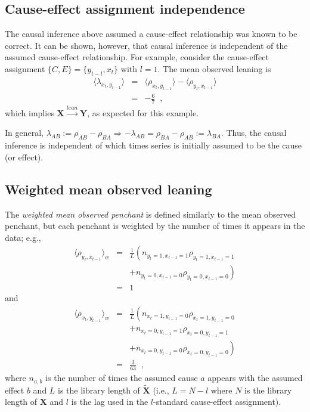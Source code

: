 \documentclass[twocolumn,aps,pre,groupedaddress]{revtex4-1}
\begin{document}
\subsection{Cause-effect assignment independence}
The causal inference above assumed a cause-effect relationship was known to be correct.  It can be shown, however, that causal inference is independent of the assumed cause-effect relationship.  For example, consider the cause-effect assignment $\{C,E\}=\{y_{t-l},x_t\}$ with $l=1$. The mean observed leaning is
\begin{eqnarray*}
\langle \lambda_{x_t,y_{t-1}} \rangle &=& \langle \rho_{x_t,y_{t-1}} \rangle - \langle \rho_{y_t,x_{t-1}} \rangle\\
&=& -\frac{6}{7}\;\;,
\end{eqnarray*}
which implies $\mathbf{X}\xrightarrow{lean}\mathbf{Y}$, as expected for this example.

In general, $\lambda_{AB} := \rho_{AB} - \rho_{BA}\Rightarrow -\lambda_{AB} = \rho_{BA} - \rho_{AB} := \lambda_{BA}$.  Thus, the causal inference is independent of which times series is initially assumed to be the cause (or effect).  

\subsection{Weighted mean observed leaning}
\label{sec:wmean}
The {\em weighted mean observed penchant} is defined similarly to the mean observed penchant, but each penchant is weighted by the number of times it appears in the data; e.g.,\
\begin{eqnarray*}
\langle \rho_{y_t,x_{t-1}} \rangle_w &=& \frac{1}{L}\left(n_{y_t=1,x_{t-1}=1}\rho_{y_t=1,x_{t-1}=1} \right.\\
& & \left.+ n_{y_t=0,x_{t-1}=0}\rho_{y_t=0,x_{t-1}=0}\right)\\
&=& 1
\end{eqnarray*}
and
\begin{eqnarray*}
\langle \rho_{x_t,y_{t-1}} \rangle_w &=& \frac{1}{L}\left(n_{x_t=1,y_{t-1}=0}\rho_{x_t=1,y_{t-1}=0} \right.\\
& & +n_{x_t=0,y_{t-1}=1}\rho_{x_t=0,y_{t-1}=1}\\
& & \left.+ n_{x_t=0,y_{t-1}=0}\rho_{x_t=0,y_{t-1}=0}\right)\\
&=& \frac{3}{63}\;\;,
\end{eqnarray*}
where $n_{a,b}$ is the number of times the assumed cause $a$ appears with the assumed effect $b$ and $L$ is the library length of $\tilde{\mathbf{X}}$ (i.e., $L=N-l$ where $N$ is the library length of $\mathbf{X}$ and $l$ is the lag used in the $l$-standard cause-effect assignment).  
\end{document}

